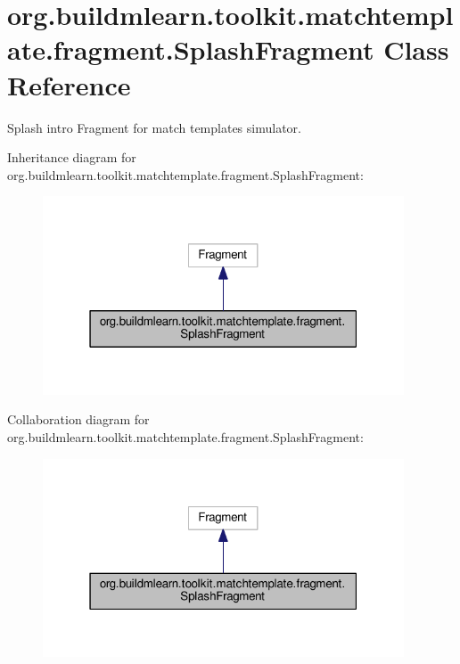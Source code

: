 \hypertarget{classorg_1_1buildmlearn_1_1toolkit_1_1matchtemplate_1_1fragment_1_1SplashFragment}{}\section{org.\+buildmlearn.\+toolkit.\+matchtemplate.\+fragment.\+Splash\+Fragment Class Reference}
\label{classorg_1_1buildmlearn_1_1toolkit_1_1matchtemplate_1_1fragment_1_1SplashFragment}


Splash intro Fragment for match template\textquotesingle{}s simulator.  




Inheritance diagram for org.\+buildmlearn.\+toolkit.\+matchtemplate.\+fragment.\+Splash\+Fragment\+:
\nopagebreak
\begin{figure}[H]
\begin{center}
\leavevmode
\includegraphics[width=304pt]{classorg_1_1buildmlearn_1_1toolkit_1_1matchtemplate_1_1fragment_1_1SplashFragment__inherit__graph}
\end{center}
\end{figure}


Collaboration diagram for org.\+buildmlearn.\+toolkit.\+matchtemplate.\+fragment.\+Splash\+Fragment\+:
\nopagebreak
\begin{figure}[H]
\begin{center}
\leavevmode
\includegraphics[width=304pt]{classorg_1_1buildmlearn_1_1toolkit_1_1matchtemplate_1_1fragment_1_1SplashFragment__coll__graph}
\end{center}
\end{figure}

